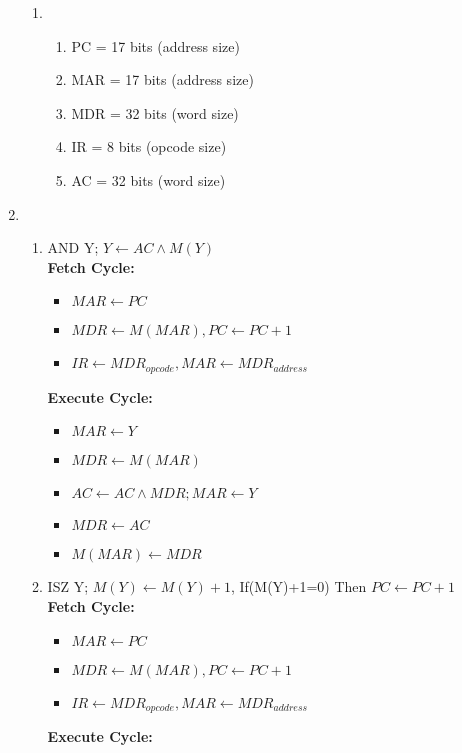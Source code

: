 \documentclass{article}
\begin{document}
\begin{enumerate}
\begin{enumerate}
        \item\begin{enumerate}
          \item PC = 17 bits  (address size)
          \item MAR = 17 bits (address size)
          \item MDR = 32 bits (word size)
          \item IR = 8 bits   (opcode size)
          \item AC = 32 bits  (word size)
          \end{enumerate}
      \end{enumerate}
      \item\begin{enumerate}
        \item AND Y;  $Y \leftarrow AC \wedge M(Y)$\\
            \textbf{Fetch Cycle:}\begin{itemize}
              \item $MAR \leftarrow PC$
              \item $MDR \leftarrow M(MAR), PC \leftarrow PC + 1$
              \item $IR \leftarrow MDR_{opcode}, MAR \leftarrow MDR_{address}$
            \end{itemize}
            \textbf{Execute Cycle:}\begin{itemize}
              \item $MAR \leftarrow Y$
              \item $MDR \leftarrow M(MAR)$
              \item $AC \leftarrow AC \wedge MDR; MAR \leftarrow Y$
              \item $MDR \leftarrow AC$
              \item $M(MAR) \leftarrow MDR$
              \end{itemize}
        \item ISZ Y;  $M(Y) \leftarrow M(Y) + 1$, If(M(Y)+1=0) Then $PC \leftarrow PC + 1$\\
            \textbf{Fetch Cycle:}\begin{itemize}
              \item $MAR \leftarrow PC$
              \item $MDR \leftarrow M(MAR), PC \leftarrow PC + 1$
              \item $IR \leftarrow MDR_{opcode}, MAR \leftarrow MDR_{address}$
              \end{itemize}
            \textbf{Execute Cycle:}\\

\end{enumerate}
\end{enumerate}
\end{document}

